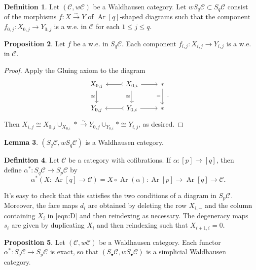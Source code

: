 \documentclass[10pt,letterpaper,cm]{nupset}
\theoremstyle{definition}
\newtheorem{definition}{Definition}
\theoremstyle{theorem}
\newtheorem{lemma}[definition]{Lemma}
\newtheorem{prop}[definition]{Proposition}
\theoremstyle{remark}
\newcommand{\1}{\mathbf{1}}
\renewcommand{\c}{\mathscr{C}}
\newcommand{\0}{\vec 0}
\DeclareMathOperator{\Ar}{Ar}
\begin{document}
\begin{definition}
Let $\left(\c, w{\c}\right)$ be a Waldhausen category. Let $w S_q\c \subset S_q \c$ consist of the morphisms $f: X \overset{\sim}{\longrightarrow} Y$ of $\Ar[q]$-shaped diagrams such that the component $f_{0, j} : X_{0, j} \to Y_{0, j}$ is a w.e. in $\c$ for each $1\leq j \leq q$.
\end{definition}

\begin{prop}
Let $f$ be a w.e. in $S_q \c$.  Each component $f_{i, j}: X_{i, j} \to Y_{i, j}$ is a w.e. in $\c$.
\end{prop}
\begin{proof}
Apply the Gluing axiom to the diagram
\[
\begin{tikzcd}
{X_{0, j}} \arrow[d, "\cong"'] & {X_{0, i}} \arrow[l, tail] \arrow[r] \arrow[d, "\cong"'] & \ast \arrow[d, "="'] \\
{Y_{0, j}} & {Y_{0, i}} \arrow[l, tail] \arrow[r] & \ast
\end{tikzcd}.
\] Then $X_{i, j} \cong X_{0, j} \cup_{X_{0, i}} \ast \overset{\sim}{\longrightarrow} Y_{0, j} \cup_{Y_{0, i}} \ast \cong Y_{i, j}$, as desired.
\end{proof}

\begin{lemma}
$\left(S_q \c, wS_q \c\right)$ is a Waldhausen category. 
\end{lemma}

\begin{definition}
Let $\c$ be a category with cofibrations. If $\alpha : [p] \to [q]$, then define $\alpha^{\ast} : S_q \c \to S_p \c$ by
$$\alpha^{\ast}(X: \Ar[q] \to \c) = X \circ \Ar(\alpha) : \Ar[p] \to \Ar[q] \to \c.$$
\end{definition}

It's easy to check that this satisfies the two conditions of a diagram in $S_p \c$.
Moreover, the face maps $d_i$ are obtained by deleting the row $X_{i, -}$ and the column containing $X_i$ in \eqref{eqn:D} and then reindexing as necessary. The degeneracy maps $s_i$ are given by duplicating $X_i$ and then reindexing such that $X_{i+1, i} =0$.

\begin{prop}
Let $\left(\c, w{\c}\right)$ be a Waldhausen category. Each functor $\alpha^{\ast}: S_q \c \to S_p \c$ is exact, so that $\left(S_{\bullet}\c, wS_{\bullet} \c\right)$ is a simplicial Waldhausen category.
\end{prop}	
\end{document}
